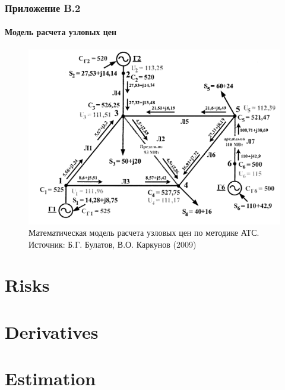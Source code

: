 \documentclass[c, dvipsnames]{beamer}  %
\begin{document}
\begin{frame}[shrink=5]
\frametitle{Приложение B.2} 
\framesubtitle{Модель расчета узловых цен} 

\begin{figure}
\centering
\includegraphics[width=0.8\linewidth]{screenshot022}
\caption{ Математическая модель расчета узловых цен по методике АТС. Источник: Б.Г. Булатов, В.О. Каркунов (2009)  }
\label{fig:screenshot015}
\end{figure}



\end{frame}







\section{Risks}


\section{Derivatives}


\section{Estimation}



%
%
%
%
%
%
%
%
%
\end{document}
